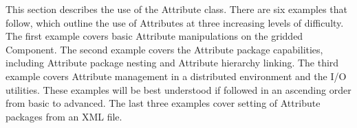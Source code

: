 %


This section describes the use of the Attribute class.  There are six examples that follow, which outline the use of Attributes at three increasing levels of difficulty.  The first example covers basic Attribute manipulations on the gridded Component.  The second example covers the Attribute package capabilities, including Attribute package nesting and Attribute hierarchy linking.  The third example covers Attribute management in a distributed environment and the I/O utilities.  These examples will be best understood if followed in an ascending order from basic to advanced.  The last three examples cover setting of Attribute packages from an XML file.
